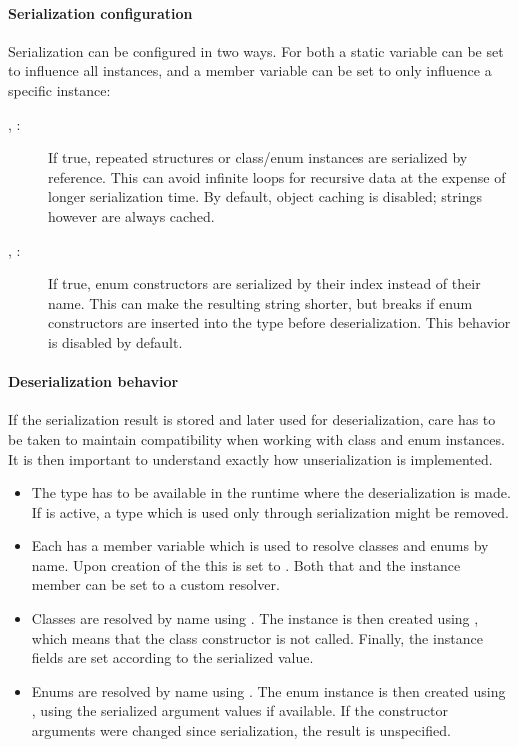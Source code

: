 \paragraph{Serialization configuration}

Serialization can be configured in two ways. For both a static variable can be set to influence all  instances, and a member variable can be set to only influence a specific instance:

\begin{description}
	\item[, :] If true, repeated structures or class\slash enum instances are serialized by reference. This can avoid infinite loops for recursive data at the expense of longer serialization time. By default, object caching is disabled; strings however are always cached.
	\item[, :] If true, enum constructors are serialized by their index instead of their name. This can make the resulting string shorter, but breaks if enum constructors are inserted into the type before deserialization. This behavior is disabled by default.
\end{description}

\paragraph{Deserialization behavior}

If the serialization result is stored and later used for deserialization, care has to be taken to maintain compatibility when working with class and enum instances. It is then important to understand exactly how unserialization is implemented.

\begin{itemize}
	\item The type has to be available in the runtime where the deserialization is made. If  is active, a type which is used only through serialization might be removed.
	\item Each  has a member variable  which is used to resolve classes and enums by name. Upon creation of the  this is set to . Both that and the instance member can be set to a custom resolver.
	\item Classes are resolved by name using . The instance is then created using , which means that the class constructor is not called. Finally, the instance fields are set according to the serialized value.
	\item Enums are resolved by name using . The enum instance is then created using , using the serialized argument values if available. If the constructor arguments were changed since serialization, the result is unspecified.
\end{itemize}

